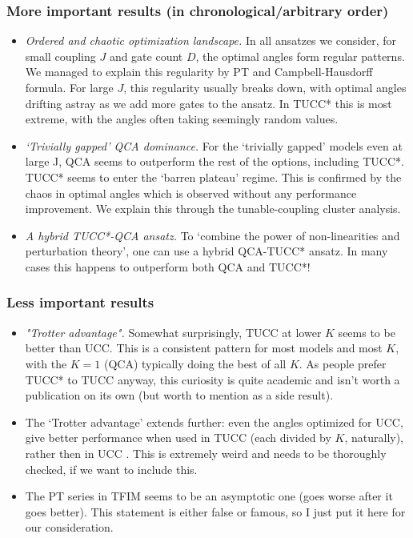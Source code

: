 \documentclass[10pt, a4paper]{article}
\begin{document}
\subsubsection*{More important results (in chronological/arbitrary order)}

\begin{itemize}
\item \textit{Ordered and chaotic optimization landscape.} In all ansatzes we consider, for small coupling $J$ and gate count $D$, the optimal angles form regular patterns. We managed to explain this regularity by PT and Campbell-Hausdorff formula. For large $J$, this regularity usually breaks down, with optimal angles drifting astray as we add more gates to the ansatz. In TUCC* this is most extreme, with the angles often taking seemingly random values. 
\item \textit{`Trivially gapped' QCA dominance.} For the `trivially gapped' models even at large J, QCA seems to outperform the rest of the options, including TUCC*. TUCC* seems to enter the `barren plateau' regime. This is confirmed by the chaos in optimal angles which is observed without any performance improvement. We explain this through the tunable-coupling cluster analysis.
\item \textit{A hybrid TUCC*-QCA ansatz.} To `combine the power of non-linearities and perturbation theory', one can use a hybrid QCA-TUCC* ansatz. In many cases this happens to outperform both QCA and TUCC*!
\end{itemize}

\subsubsection*{Less important results}
\begin{itemize}
\item \textit{"Trotter advantage".} Somewhat surprisingly, TUCC at lower $K$ seems to be better than UCC. This is a consistent pattern for most models and most $K$, with the $K=1$ (QCA) typically doing the best of all $K$. As people prefer TUCC* to TUCC anyway, this curiosity is quite academic and isn't worth a publication on its own (but worth to mention as a side result).

\item The `Trotter advantage' extends further: even the angles optimized for UCC, give better performance when used in TUCC (each divided by $K$, naturally), rather then in UCC . This is extremely weird and needs to be thoroughly checked, if we want to include this.

\item The PT series in TFIM seems to be an asymptotic one (goes worse after it goes better). This statement is either false or famous, so I just put it here for our consideration.
\end{itemize}
\end{document}
